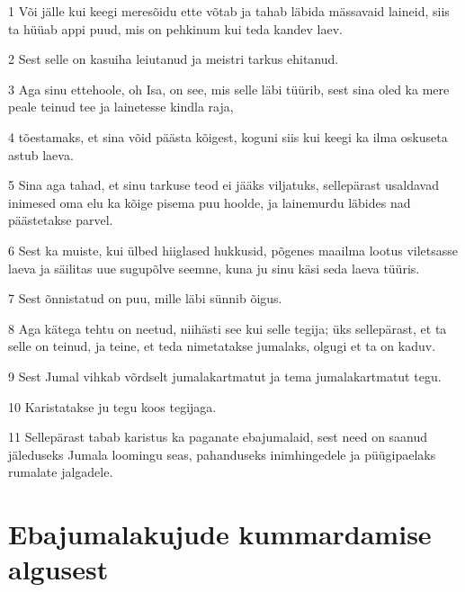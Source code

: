 \par 1 Või jälle kui keegi meresõidu ette võtab ja tahab läbida mässavaid laineid, siis ta hüüab appi puud, mis on pehkinum kui teda kandev laev.
\par 2 Sest selle on kasuiha leiutanud ja meistri tarkus ehitanud.
\par 3 Aga sinu ettehoole, oh Isa, on see, mis selle läbi tüürib, sest sina oled ka mere peale teinud tee ja lainetesse kindla raja,
\par 4 tõestamaks, et sina võid päästa kõigest, koguni siis kui keegi ka ilma oskuseta astub laeva.
\par 5 Sina aga tahad, et sinu tarkuse teod ei jääks viljatuks, sellepärast usaldavad inimesed oma elu ka kõige pisema puu hoolde, ja lainemurdu läbides nad päästetakse parvel.
\par 6 Sest ka muiste, kui ülbed hiiglased hukkusid, põgenes maailma lootus viletsasse laeva ja säilitas uue sugupõlve seemne, kuna ju sinu käsi seda laeva tüüris.
\par 7 Sest õnnistatud on puu, mille läbi sünnib õigus.
\par 8 Aga kätega tehtu on neetud, niihästi see kui selle tegija; üks sellepärast, et ta selle on teinud, ja teine, et teda nimetatakse jumalaks, olgugi et ta on kaduv.
\par 9 Sest Jumal vihkab võrdselt jumalakartmatut ja tema jumalakartmatut tegu.
\par 10 Karistatakse ju tegu koos tegijaga.
\par 11 Sellepärast tabab karistus ka paganate ebajumalaid, sest need on saanud jäleduseks Jumala loomingu seas, pahanduseks inimhingedele ja püügipaelaks rumalate jalgadele. 

\section*{Ebajumalakujude kummardamise algusest}

